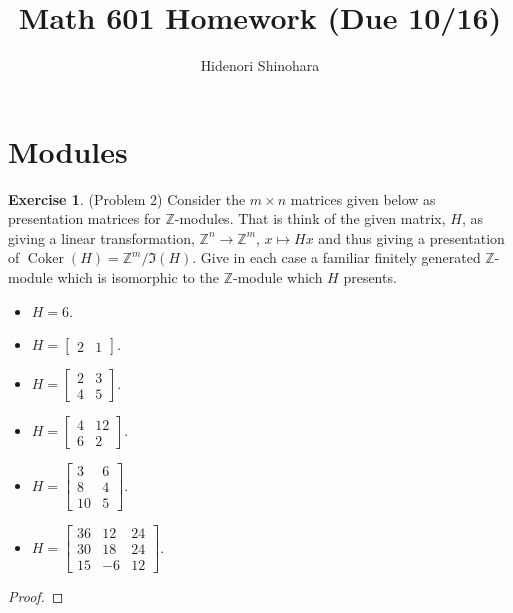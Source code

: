 \documentclass[12pt, psamsfonts]{amsart}
\theoremstyle{definition}
\newtheorem*{exer}{Exercise}
\theoremstyle{remark}
\DeclareMathOperator{\Coker}{Coker}
\numberwithin{equation}{section}
\begin{document}
\title{Math 601 Homework (Due 10/16)}
\author{Hidenori Shinohara}
\maketitle

\tableofcontents

\section{Modules}

\begin{exer}{(Problem 2)}
  Consider the $m \times n$ matrices given below as presentation matrices for $\mathbb{Z}$-modules.
  That is think of the given matrix, $H$, as giving a linear transformation, $\mathbb{Z}^n \rightarrow \mathbb{Z}^m$, $x \mapsto Hx$ and thus giving a presentation of $\Coker(H) = \mathbb{Z}^m/\Im(H)$.
  Give in each case a familiar finitely generated $\mathbb{Z}$-module which is isomorphic to the $\mathbb{Z}$-module which $H$ presents.
  \begin{itemize}
    \item
      $H = 6$.
    \item
      $H = \begin{bmatrix} 2 & 1 \end{bmatrix}$.
    \item
      $H = \begin{bmatrix} 2 & 3 \\ 4 & 5 \end{bmatrix}$.
    \item
      $H = \begin{bmatrix} 4 & 12 \\ 6 & 2 \end{bmatrix}$.
    \item
      $H = \begin{bmatrix} 3 & 6 \\ 8 & 4 \\ 10 & 5 \end{bmatrix}$.
    \item
      $H = \begin{bmatrix} 36 & 12 & 24 \\ 30 & 18 & 24 \\ 15 & -6 & 12 \end{bmatrix}$.
  \end{itemize}
\end{exer}

\begin{proof}
  \todo[inline,caption={}]{
  }
\end{proof}
\end{document}
